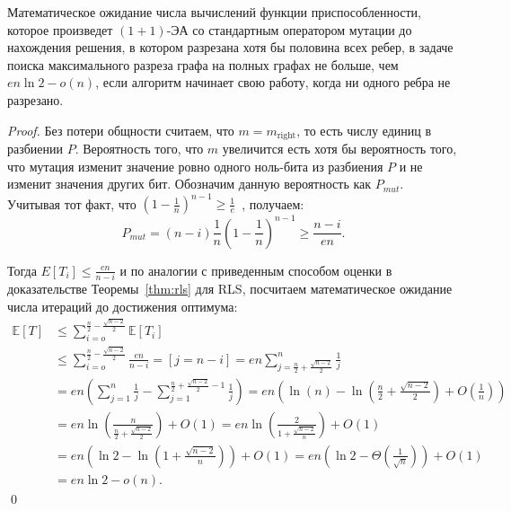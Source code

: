 \documentclass[times]{itmo-student-thesis}
\newcommand{\oea}{\mbox{$(1 + 1)$-ЭА}\xspace}
\begin{document}
\begin{theorem} \label{thm:one}
  Математическое ожидание числа вычислений функции приспособленности, которое произведет \oea со стандартным оператором мутации до нахождения решения, в котором разрезана хотя бы половина всех ребер, в задаче поиска максимального разреза графа на полных графах не больше, чем $en\ln 2 - o(n)$, если алгоритм начинает свою работу, когда ни одного ребра не разрезано.
\end{theorem}

\begin{proof}
  Без потери общности считаем, что $m = m_{\text{right}}$, то есть числу единиц в разбиении $P$. Вероятность того, что $m$ увеличится есть хотя бы вероятность того, что мутация изменит значение ровно одного ноль-бита из разбиения $P$ и не изменит значения других бит. Обозначим данную вероятность как $P_{mut}$.
  Учитывая тот факт, что
  $ (1 - \frac{1}{n})^{n-1} \ge \frac{1}{e}$~\cite{DoerrDE15},
  получаем:
  $$
    P_{mut} = (n-i)\frac{1}{n}\left(1 - \frac{1}{n}\right)^{n-1} \ge \frac{n-i}{en}.
  $$

  Тогда $E[T_i] \leq \frac{en}{n-i}$ и по аналогии с приведенным способом оценки в доказательстве Теоремы~\ref{thm:rls} для RLS, посчитаем математическое ожидание числа итераций до достижения оптимума:
  \begin{align*}
    \mathbb{E}[T] &\le
                \sum_{i=o}^{\frac{n}{2} - \frac{\sqrt{n-2}}{2}} \mathbb{E}[T_i]  \\
        &\leq
                \sum_{i=o}^{\frac{n}{2} - \frac{\sqrt{n-2}}{2}} \frac{en}{n-i} = [j = n - i] = en \sum_{j=\frac{n}{2} + \frac{\sqrt{n-2}}{2}}^{n} \frac{1}{j}  \\
        &=      en \left(\sum_{j=1}^{n}\frac{1}{j} -  \sum_{j=1}^{\frac{n}{2} +  \frac{\sqrt{n-2}}{2} - 1} \frac{1}{j} \right) =
        en\left(\ln(n) - \ln\left(\frac{n}{2} + \frac{\sqrt{n-2}}{2}\right) + O\left(\frac{1}{n}\right) \right) \\
        &=
                en \ln\left(\frac{n}{\frac{n}{2} + \frac{\sqrt{n-2}}{2}}\right) + O(1) = en \ln\left(\frac{2}{1 + \frac{\sqrt{n-2}}{n}}\right) + O(1) \\
        &=      en\left(\ln2 - \ln\left(1 + \frac{\sqrt{n-2}}{n}\right)\right) + O(1) = en\left(\ln2 - \Theta\left(\frac{1}{\sqrt{n}}\right)\right) + O(1) \\
        &=
                 en \ln2 - o(n).
  \end{align*}
  \qed
\end{proof}
\end{document}
